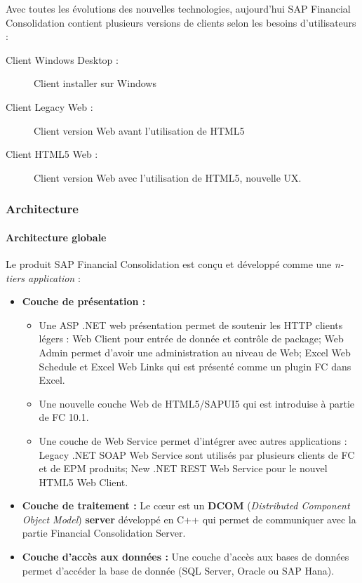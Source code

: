 \par Avec toutes les évolutions des nouvelles technologies, aujourd'hui SAP Financial Consolidation contient plusieurs versions de clients selon les besoins d'utilisateurs : 
    \begin{description}
        \item [Client Windows Desktop :] Client installer sur Windows
        \item [Client Legacy Web :] Client version Web avant l'utilisation de HTML5
        \item [Client HTML5 Web :] Client version Web avec l'utilisation de HTML5, nouvelle UX.
    \end{description}
    \subsubsection{Architecture}
    
    \paragraph{Architecture globale}
    Le produit SAP Financial Consolidation est conçu et développé comme une \textit{n-tiers application} :
    \begin{itemize}[label=\textbullet]
        \item \textbf{Couche de présentation :} 
            \begin{itemize}
                \item Une ASP .NET web présentation permet de soutenir les HTTP clients légers : Web Client pour entrée de donnée et contrôle de package; Web Admin permet d'avoir une administration au niveau de Web; Excel Web Schedule et Excel Web Links qui est présenté comme un plugin FC dans Excel.
                \item Une nouvelle couche Web de HTML5/SAPUI5 qui est introduise à partie de FC 10.1.
                \item Une couche de Web Service permet d'intégrer avec autres applications : Legacy .NET SOAP Web Service sont utilisés par plusieurs clients de FC et de EPM produits; New .NET REST Web Service pour le nouvel HTML5 Web Client.
            \end{itemize}
        \item \textbf{Couche de traitement :} Le cœur est un \textbf{DCOM} (\textit{Distributed Component Object Model}) \textbf{server} développé en C++ qui permet de communiquer avec la partie Financial Consolidation Server.
        \item \textbf{Couche d'accès aux données :} Une couche d'accès aux bases de données permet d'accéder la base de donnée (SQL Server, Oracle ou SAP Hana).
    \end{itemize}
    
